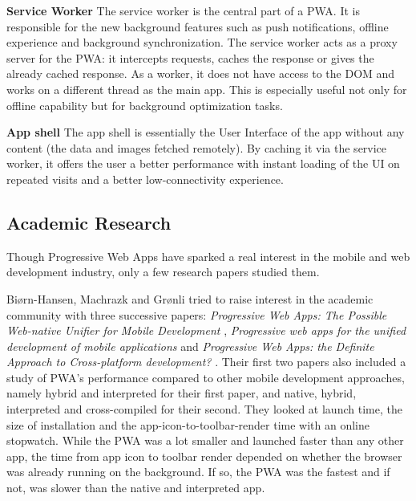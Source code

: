 \documentclass{kththesis}
\begin{document}
\medskip
\textbf{Service Worker} \newline
The service worker is the central part of a PWA. It is responsible for the new background features such as push notifications, offline experience and background synchronization\cite{SW_def}. The service worker acts as a proxy server for the PWA: it intercepts requests, caches the response or gives the already cached response. As a worker, it does not have access to the DOM and works on a different thread as the main app. This is especially useful not only for offline capability but for background optimization tasks.

\medskip
\textbf{App shell} \newline
The app shell is essentially the User Interface of the app without any content \cite{AppShell_def} (the data and images fetched remotely). By caching it via the service worker, it offers the user a better performance with instant loading of the UI on repeated visits and a better low-connectivity experience.

\subsection{Academic Research} 


Though Progressive Web Apps have sparked a real interest in the mobile and web development industry, only a few research papers studied them\cite{PWApossibleUnifer, Biorn-Hansen2, Biorn-Hansen3}.

Biørn-Hansen, Machrazk and Grønli tried to raise interest in the academic community with three successive papers: \textit{Progressive Web Apps: The Possible Web-native Unifier for Mobile Development} \cite{PWApossibleUnifer}, \textit{Progressive web apps for the unified development of mobile applications} \cite{Biorn-Hansen2} and \textit{Progressive Web Apps: the Definite Approach to Cross-platform development?} \cite{Biorn-Hansen3}. Their first two papers also included a study of PWA's performance compared to other mobile development approaches, namely hybrid and interpreted for their first paper, and native, hybrid, interpreted and cross-compiled for their second. They looked at launch time, the size of installation and the app-icon-to-toolbar-render time with an online stopwatch. While the PWA was a lot smaller and launched faster than any other app, the time from app icon to toolbar render depended on whether the browser was already running on the background. If so, the PWA was the fastest and if not, was slower than the native and interpreted app. 
\end{document}
